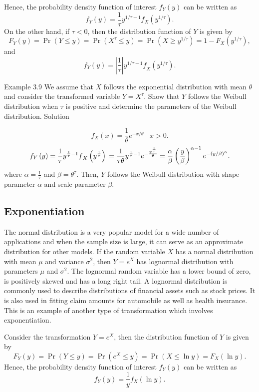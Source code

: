 \documentclass[]{book}
\theoremstyle{definition}
\theoremstyle{definition}
\theoremstyle{definition}
\theoremstyle{remark}
\begin{document}
Hence, the probability density function of interest \(f_{Y}(y)\) can be
written as
\[f_{Y}(y) = \frac{1}{\tau} y^{1/ \tau - 1} f_{X}\left( y^{1/ \tau} \right).\]
On the other hand, if \(\tau < 0\), then the distribution function of
\(Y\) is given by
\[F_{Y}\left( y \right) = \Pr\left( Y \leq y \right) = \Pr\left( X^{\tau} \leq y \right) = \Pr\left( X \geq y^{1/ \tau} \right) = 1 - F_{X}\left( y^{1/ \tau} \right), \]
and
\[f_{Y}(y) = \left| \frac{1}{\tau} \right|{y^{1/ \tau - 1}f}_{X}\left( y^{1/ \tau} \right).\]

Example 3.9 We assume that \(X\) follows the exponential distribution
with mean \(\theta\) and consider the transformed variable
\(Y = X^{\tau}\). Show that \(Y\) follows the Weibull distribution when
\(\tau\) is positive and determine the parameters of the Weibull
distribution. Solution

\[f_{X}(x) = \frac{1}{\theta}e^{- x/ \theta} \ \ \ \, x > 0.\]
\[f_{Y}\left( y \right) = \frac{1}{\tau}{y^{\frac{1}{\tau} - 1}f}_{X}\left( y^{\frac{1}{\tau}} \right) \\
= \frac{1}{\tau \theta }y^{\frac{1}{\tau} - 1}e^{- \frac{y^{\frac{1}{\tau}}}{\theta}} = \frac{\alpha}{\beta}\left( \frac{y}{\beta} \right)^{\alpha - 1}e^{- \left( y/ \beta \right)^{\alpha}}.\]
where \(\alpha = \frac{1}{\tau}\) and \(\beta = \theta^{\tau}\). Then,
\(Y\) follows the Weibull distribution with shape parameter \(\alpha\)
and scale parameter \(\beta\).

\subsection{Exponentiation}\label{exponentiation}

The normal distribution is a very popular model for a wide number of
applications and when the sample size is large, it can serve as an
approximate distribution for other models. If the random variable \(X\)
has a normal distribution with mean \(\mu\) and variance \(\sigma^{2}\),
then \(Y = e^{X}\) has lognormal distribution with parameters \(\mu\)
and \(\sigma^{2}\). The lognormal random variable has a lower bound of
zero, is positively skewed and has a long right tail. A lognormal
distribution is commonly used to describe distributions of financial
assets such as stock prices. It is also used in fitting claim amounts
for automobile as well as health insurance. This is an example of
another type of transformation which involves exponentiation.

Consider the transformation \(Y = e^{X}\), then the distribution
function of \(Y\) is given by
\[F_{Y}\left( y \right) = \Pr\left( Y \leq y \right) = \Pr\left( e^{X} \leq y \right) = \Pr\left( X \leq \ln y \right) = F_{X}\left( \ln y \right).\]
Hence, the probability density function of interest \(f_{Y}(y)\) can be
written as \[f_{Y}(y) = \frac{1}{y}f_{X}\left( \ln y \right).\]
\end{document}
